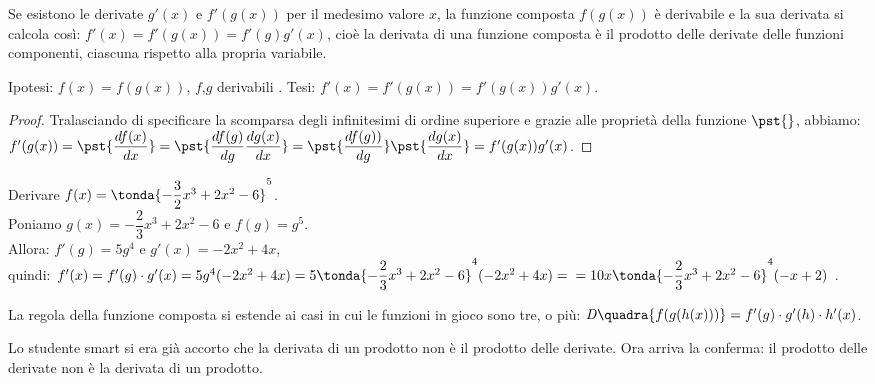 \begin{teorema}
  \label{teo:diff01_dericomp}
 Se esistono le derivate $g'(x)$ e $f'(g(x))$ per il medesimo valore $x$,
 la funzione composta $f(g(x))$ è derivabile e la sua derivata si calcola
 così: $f'(x)=f'(g(x))=f'(g)g'(x)$, cioè la derivata di una funzione composta
 è il prodotto delle derivate delle funzioni componenti, ciascuna rispetto
 alla propria variabile.
\end{teorema}
\noindent Ipotesi: $f(x)=f(g(x))$, $f$,$g$ derivabili .\tab 
Tesi: $f'(x)=f'(g(x))=f'(g(x))g'(x)$.
\begin{proof}
  Tralasciando di specificare la scomparsa degli infinitesimi di ordine 
  superiore e grazie alle proprietà della funzione $\pst{}$, abbiamo:\\
  $f'(g(x))=\pst{\dfrac{df(x)}{dx}}=
  \pst{\dfrac{df(g)}{dg}\dfrac{dg(x)}{dx}}=
  \pst{\dfrac{df(g))}{dg}}\pst{\dfrac{dg(x)}{dx}}=
  f'(g(x))g'(x)$.
\end{proof}
\begin{esempio}
  Derivare $f(x)=\tonda{-\dfrac{3}{2}x^3+2x^2-6}^5$.\\
  Poniamo $g(x)=-\dfrac{2}{3}x^3+2x^2-6$ e $f(g)=g^5$. \\
  Allora: 
  $f'(g)= 5g^4$ e $g'(x)=-2x^2+4x$, \\
  quindi: 
  $f'(x)=f'(g)\cdot g'(x)=5g^4(-2x^2+4x)=
  5\tonda{-\dfrac{2}{3}x^3+2x^2-6}^4(-2x^2+4x)=\\
  =10x\tonda{-\dfrac{2}{3}x^3+2x^2-6}^4(-x+2)$ .
\end{esempio}
\begin{osservazione}
 La regola della funzione composta si estende ai casi in cui le funzioni 
 in gioco sono tre, o più:
 $\mathit{D}\quadra{f(g(h(x)))}=f'(g)\cdot g'(h)\cdot h'(x)$.
\end{osservazione}
\begin{osservazione}
 Lo studente smart si era già accorto che la derivata di un prodotto non 
 è il prodotto delle derivate. Ora arriva la conferma:
 il prodotto delle derivate non è la derivata di un prodotto.
\end{osservazione}


